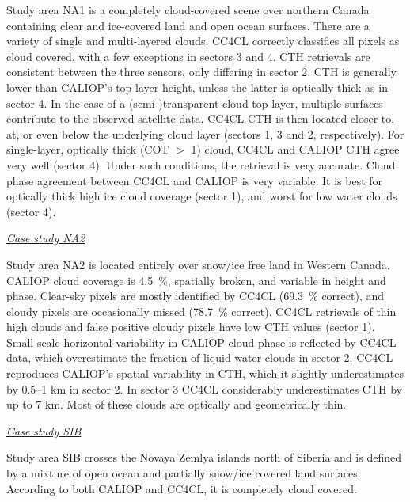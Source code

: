 Study area NA1 is a completely cloud-covered scene over northern Canada containing clear and ice-covered land and open ocean surfaces. There are a variety of single and multi-layered clouds. CC4CL correctly classifies all pixels as cloud covered, with a few exceptions in sectors 3 and 4. CTH retrievals are consistent between the three sensors, only differing in sector 2. CTH is generally lower than CALIOP's top layer height, unless the latter is optically thick as in sector 4. In the case of a (semi-)transparent cloud top layer, multiple surfaces contribute to the observed satellite data. CC4CL CTH is then located closer to, at, or even below the underlying cloud layer (sectors 1, 3 and 2, respectively). For single-layer, optically thick (COT $>$ 1) cloud, CC4CL and CALIOP CTH agree very well (sector 4). Under such conditions, the retrieval is very accurate. Cloud phase agreement between CC4CL and CALIOP is very variable. It is best for optically thick high ice cloud coverage (sector 1), and worst for low water clouds (sector 4).

\vspace{5mm}\underline{\textit{Case study NA2}}\vspace{2mm}

Study area NA2 is located entirely over snow/ice free land in Western Canada. CALIOP cloud coverage is 4.5~\%, spatially broken, and variable in height and phase. Clear-sky pixels are mostly identified by CC4CL (69.3~\% correct), and cloudy pixels are occasionally missed (78.7~\% correct). CC4CL retrievals of thin high clouds and false positive cloudy pixels have low CTH values (sector 1). Small-scale horizontal variability in CALIOP cloud phase is reflected by CC4CL data, which overestimate the fraction of liquid water clouds in sector 2. CC4CL reproduces CALIOP's spatial variability in CTH, which it slightly underestimates by 0.5--1 km in sector 2. In sector 3 CC4CL considerably underestimates CTH by up to 7 km. Most of these clouds are optically and geometrically thin.

\vspace{5mm}\underline{\textit{Case study SIB}}\vspace{2mm}

Study area SIB crosses the Novaya Zemlya islands north of Siberia and is defined by a mixture of open ocean and partially snow/ice covered land surfaces. According to both CALIOP and CC4CL, it is completely cloud covered. 

